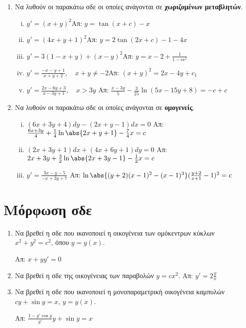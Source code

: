 \documentclass[a4paper,table]{report}
\begin{document}
\begin{center}
\end{center}

\vspace{\baselineskip}


\begin{enumerate}

  \item Να λυθούν οι παρακάτω σδε οι οποίες ανάγονται σε \textbf{χωριζομένων μεταβλητών}.

  \begin{enumerate}[i)]
    \item $y'=(x+y)^2$\hfill Απ: $y=\tan (x+c)-x$
    \item $y'=(4x+y+1)^2$\hfill Απ: $y=2\tan(2x+c)-1-4x$
    \item $y'=3(1-x+y)+(x-y)^2$\hfill Απ: $y=x-2+\frac{1}{1-c \mathrm{e}^x}$
    \item $y'=\frac{-x-y+1}{x+y+2}, \quad x+y\neq -2$\hfill Απ: $(x+y)^2=2x-4y+c_1$
    \item $y'=\frac{2x-6y+3}{x-3y+1}, \quad x>3y$
      \hfill Απ: $\frac{x-3y}{5}-\frac{3}{25}\ln(5x-15y+8)=-c+c$
  \end{enumerate}

\item Να λυθούν οι παρακάτω σδε οι οποίες ανάγονται σε \textbf{ομογενείς}.

  \begin{enumerate}[i)]
    \item $ (6x+3y+4)dy - (2x+y-1)dx = 0 $ 
      \hfill Απ: $ \frac{6x+3y}{4} + \frac{1}{4} \ln{\abs{2x+y+1}} - \frac{7}{4}
      x = c $ 
    \item $(2x+3y+1)dx + (4x+6y+1)dy=0$
      \hfill Απ: $ 2x+3y+ \frac{3}{2} \ln{\abs{2x+3y-1}} - \frac{1}{2} x = c $  
    \item $ y' = \frac{3x-y-5}{-x+3y+7} $ 
      \hfill Απ: $ \ln{\abs{(y+2)(x-1)^{2} - (x-1)^{3}} (\frac{y+2}{x+1} -1)^{2}} = c $ 
  \end{enumerate}
\end{enumerate}


\section*{Μόρφωση σδε}

\begin{enumerate}
  \item Να βρεθεί η σδε που ικανοποιεί η οικογένεια των ομόκεντρων κύκλων 
    $ x^{2} + y^{2} = c^{2} $,  όπου  $ y=y(x) $.

    \hfill Απ: $ x+yy'=0 $ 

  \item Να βρεθεί η σδε της οικογένειας των παραβολών $ y=cx^{2} $.
    \hfill Απ: $ y'=2 \frac{y}{x} $ 

  \item  Να βρεθεί η σδε που ικανοποιεί η μονοπαραμετρική οικογένεια καμπυλών   
   $ cy+ \sin{y} = x $, $ y=y(x) $.

    \hfill Απ: $ \frac{1-y' \cos{y}}{y'} y + \sin{y} = x $ 
\end{enumerate}
\end{document}
